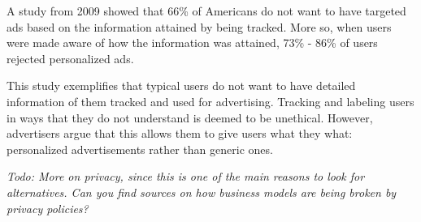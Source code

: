 A study from 2009 showed that 66\% of Americans do not want to have targeted ads based on the information attained by being tracked. More so, when users were made aware of how the information was attained, 73\% - 86\% of users rejected personalized ads. \cite{americansRejectAds}

This study exemplifies that typical users do not want to have detailed information of them tracked and used for advertising. Tracking and labeling users in ways that they do not understand is deemed to be unethical. However, advertisers argue that this allows them to give users what they what: personalized advertisements rather than generic ones. \cite{americansRejectAds}

\textit{\color{red}Todo: More on privacy, since this is one of the main reasons to look for alternatives. Can you find sources on how business models are being broken by privacy policies?}
